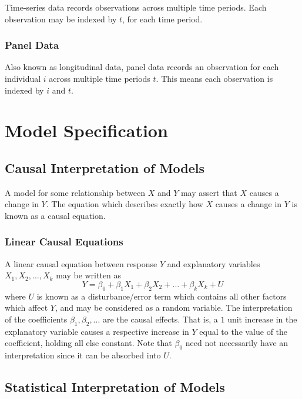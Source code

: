\documentclass[11pt]{report} %
\begin{document}
Time-series data records observations across multiple time periods. Each observation may be indexed by $t$, for each time period.

\subsubsection{Panel Data}

Also known as longitudinal data, panel data records an observation for each individual $i$ across multiple time periods $t$. This means each observation is indexed by $i$ and $t$.

\section{Model Specification}

\subsection{Causal Interpretation of Models}

A model for some relationship between $X$ and $Y$ may assert that $X$ causes a change in $Y$. The equation which describes exactly how $X$ causes a change in $Y$ is known as a causal equation.

\subsubsection{Linear Causal Equations}

A linear causal equation between response $Y$ and explanatory variables $X_{1}, X_{2}, \dots, X_{k}$ may be written as
\begin{equation}
Y = \beta_{0} + \beta_{1}X_{1} + \beta_{2}X_{2} + \dots + \beta_{k}X_{k} + U
\end{equation}
where $U$ is known as a disturbance/error term which contains all other factors which affect $Y$, and may be considered as a random variable. The interpretation of the coefficients $\beta_{1}, \beta_{2}, \dots$ are the causal effects. That is, a $1$ unit increase in the explanatory variable causes a respective increase in $Y$ equal to the value of the coefficient, holding all else constant. Note that $\beta_{0}$ need not necessarily have an interpretation since it can be absorbed into $U$.

\subsection{Statistical Interpretation of Models}
\end{document}
